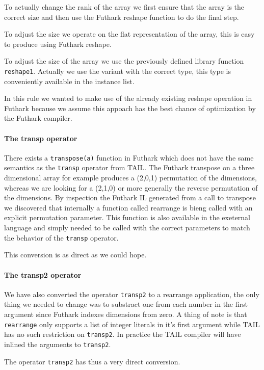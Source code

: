 \documentclass[11pt]{article}
\begin{document}
To actually change the rank of the array we first ensure that the array is the correct size and then use the Futhark reshape
function to do the final step.

To adjust the size we operate on the flat representation of the array, this is easy to produce using Futhark reshape.

To adjust the size of the array we use the previously defined library function {\tt reshape1}. Actually we use the variant with
the correct type, this type is conveniently available in the instance list.

In this rule we wanted to make use of the already existing reshape operation in Futhark because we assume this appoach has the best
chance of optimization by the Futhark compiler.

\paragraph{The transp operator} 
There exists a {\tt transpose(a)} function in Futhark which does not have the same semantics as the {\tt transp} operator from TAIL.
The Futhark transpose on a three dimensional array for example produces a (2,0,1) permutation of the dimensions, whereas we are
looking for a (2,1,0) or more generally the reverse permutation of the dimensions. By inspection the Futhark IL generated from
a call to transpose we discovered that internally a function called rearrange is bieng called with an explicit permutation parameter.
This function is also available in the exeternal language and simply needed to be called with the correct parameters to match
the behavior of the {\tt transp} operator.

This conversion is as direct as we could hope.

\paragraph{The transp2 operator} 
We have also converted the operator {\tt transp2} to a rearrange application, the only thing we needed to change was to substract
one from each number in the first argument since Futhark indexes dimensions from zero.
A thing of note is that {\tt rearrange} only supports a list of integer literals in it's first argument while TAIL has no
such restriction on {\tt transp2}. In practice the TAIL compiler will have inlined the arguments to {\tt transp2}.

The operator {\tt transp2} has thus a very direct conversion.
\end{document}
